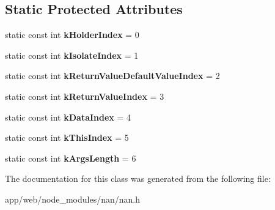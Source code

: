 \subsection*{Static Protected Attributes}
\begin{DoxyCompactItemize}
\item 
\mbox{\label{class_nan_1_1_property_callback_info_base_a3566f44ac221280dc7345adbf4d8e200}} 
static const int {\bfseries k\+Holder\+Index} = 0
\item 
\mbox{\label{class_nan_1_1_property_callback_info_base_a88e492faf0a223901514191bc6220523}} 
static const int {\bfseries k\+Isolate\+Index} = 1
\item 
\mbox{\label{class_nan_1_1_property_callback_info_base_a48960e483042cc7f8b523b71d68d6c35}} 
static const int {\bfseries k\+Return\+Value\+Default\+Value\+Index} = 2
\item 
\mbox{\label{class_nan_1_1_property_callback_info_base_a8b505fd28bb2e7e60a81ff73af4925b6}} 
static const int {\bfseries k\+Return\+Value\+Index} = 3
\item 
\mbox{\label{class_nan_1_1_property_callback_info_base_ae852b1375724a4dd1be8247d4dae6db1}} 
static const int {\bfseries k\+Data\+Index} = 4
\item 
\mbox{\label{class_nan_1_1_property_callback_info_base_a54fbaafdb1c93b31dcbb3bca63bbdd35}} 
static const int {\bfseries k\+This\+Index} = 5
\item 
\mbox{\label{class_nan_1_1_property_callback_info_base_aef411021c2d4a5ef33d50ad42881cce4}} 
static const int {\bfseries k\+Args\+Length} = 6
\end{DoxyCompactItemize}


The documentation for this class was generated from the following file\+:\begin{DoxyCompactItemize}
\item 
app/web/node\+\_\+modules/nan/nan.\+h\end{DoxyCompactItemize}
